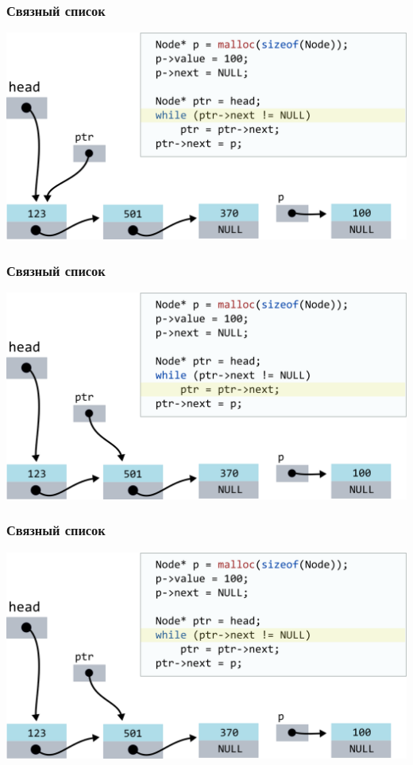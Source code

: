 \documentclass[10pt,pdf,hyperref={unicode}]{beamer}
\begin{document}
\begin{frame}[fragile]
\frametitle{Связный список}
\begin{center}
\includegraphics[width=\imageSizeMult\linewidth]{../images/codelist/codelistf_insert6.png}
\end{center}
\end{frame}



\begin{frame}[fragile]
\frametitle{Связный список}
\begin{center}
\includegraphics[width=\imageSizeMult\linewidth]{../images/codelist/codelistf_insert7.png}
\end{center}
\end{frame}



\begin{frame}[fragile]
\frametitle{Связный список}
\begin{center}
\includegraphics[width=\imageSizeMult\linewidth]{../images/codelist/codelistf_insert8.png}
\end{center}
\end{frame}
\end{document}
